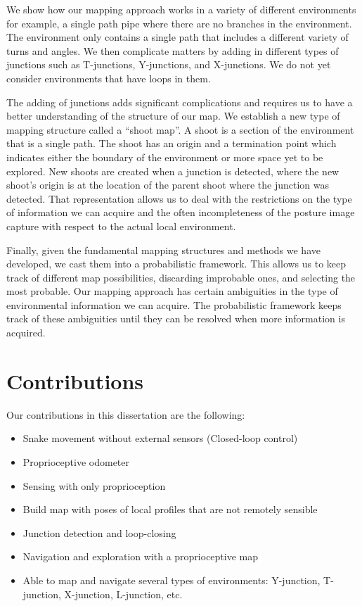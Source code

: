 We show how our mapping approach works in a variety of different environments for example, a single path pipe where there are no branches in the environment. The environment only contains a single path that includes a different variety of turns and angles. We then complicate matters by adding in different types of junctions such as T-junctions, Y-junctions, and X-junctions. We do not yet consider environments that have loops in them.

The adding of junctions adds significant complications and requires us to have a better understanding of the structure of our map. We establish a new type of mapping structure called a “shoot map”. A shoot is a section of the environment that is a single path. The shoot has an origin and a termination point which indicates either the boundary of the environment or more space yet to be explored. New shoots are created when a junction is detected, where the new shoot’s origin is at the location of the parent shoot where the junction was detected. That representation allows us to deal with the restrictions on the type of information we can acquire and the often incompleteness of the posture image capture with respect to the actual local environment.

Finally, given the fundamental mapping structures and methods we have developed, we cast them into a probabilistic framework. This allows us to keep track of different map possibilities, discarding improbable ones, and selecting the most probable. Our mapping approach has certain ambiguities in the type of environmental information we can acquire. The probabilistic framework keeps track of these ambiguities until they can be resolved when more information is acquired.

\section{Contributions}
\label{contributions}

Our contributions in this dissertation are the following:

\begin{itemize}
\item Snake movement without external sensors (Closed-loop control)

\item Proprioceptive odometer

\item Sensing with only proprioception

\item Build map with poses of local profiles that are not remotely sensible

\item Junction detection and loop-closing

\item Navigation and exploration with a proprioceptive map

\item Able to map and navigate several types of environments: Y-junction, T-junction, X-junction, L-junction, etc.

\end{itemize}

